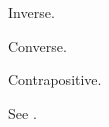 %
%

\begin{subquestions}

 
\subquestion

\begin{subsubquestions}


\subsubquestion

Inverse.


\subsubquestion

Converse.


\subsubquestion

Contrapositive.

\end{subsubquestions}
	

\subquestion

\begin{subsubquestions}


\subsubquestion

See .


\end{subsubquestions}
\end{subquestions}
